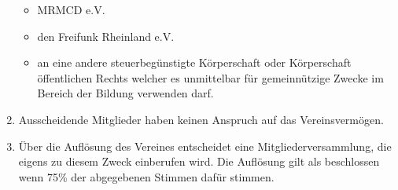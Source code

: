 \documentclass[12pt,a4paper,titlepage]{scrartcl}
\begin{document}
\begin{enumerate}
\begin{itemize}
\item MRMCD e.V.

\item den Freifunk Rheinland e.V.

\item an eine andere steuerbegünstigte Körperschaft oder Körperschaft öffentlichen Rechts welcher es unmittelbar für gemeinnützige Zwecke im Bereich der Bildung verwenden darf.
\end{itemize}
\item Ausscheidende Mitglieder haben keinen Anspruch auf das Vereinsvermögen. 
\item Über die Auflösung des Vereines entscheidet eine Mitgliederversammlung, die eigens 
zu diesem Zweck einberufen wird. Die Auflösung gilt als beschlossen wenn 75\% 
der abgegebenen Stimmen dafür stimmen.
\end{enumerate}
\end{document}
